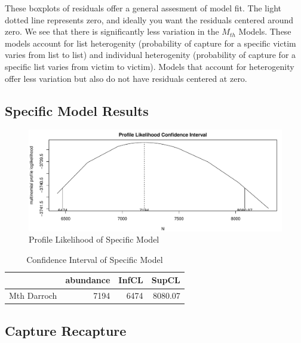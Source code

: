 \documentclass[]{article}
\begin{document}
These boxplots of residuals offer a general assesment of model fit. The
light dotted line represents zero, and ideally you want the residuals
centered around zero. We see that there is significantly less variation
in the \(M_{th}\) Models. These models account for list heterogenity
(probability of capture for a specific victim varies from list to list)
and individual heterogenity (probability of capture for a specific list
varies from victim to victim). Models that account for heterogenity
offer less variation but also do not have residuals centered at zero.

\hypertarget{specific-model-results}{%
\subsection{Specific Model Results}\label{specific-model-results}}

\begin{figure}
\centering
\includegraphics{Categorical-FinalProject_files/figure-latex/modelProfileLike-1.pdf}
\caption{Profile Likelihood of Specific Model}
\end{figure}

\begin{table}[H]

\caption{\label{tab:modelProfileLikeCI}Confidence Interval of Specific Model}
\centering
\begin{tabular}{lrrr}
\toprule
  & abundance & InfCL & SupCL\\
\midrule
Mth Darroch & 7194 & 6474 & 8080.07\\
\bottomrule
\end{tabular}
\end{table}

\hypertarget{capture-recapture}{%
\subsection{Capture Recapture}\label{capture-recapture}}
\end{document}
